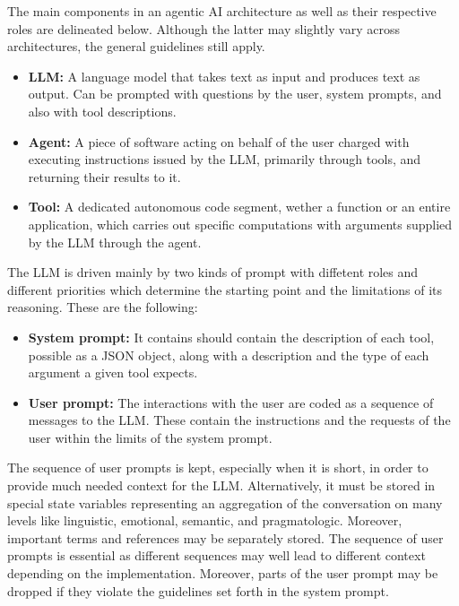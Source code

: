 \documentclass[conference, compsoc, final]{IEEEtran}
\begin{document}
The main components in an agentic AI architecture as well as their respective roles are delineated below. Although the latter may slightly vary across architectures, the general guidelines still apply.
\begin{itemize}

\item  \textbf{LLM:} A language model that takes text as input and produces text as output. Can be prompted with questions by the user, system prompts, and also with tool descriptions.

\item  \textbf{Agent:} A piece of software acting on behalf of the user charged with executing instructions issued by the LLM, primarily through tools, and returning their results to it.

\item  \textbf{Tool:} A dedicated autonomous code segment, wether a function or an entire application, which carries out specific computations with arguments supplied by the LLM through the agent.

\end{itemize}

The LLM is driven mainly by two kinds of prompt with diffetent roles and different priorities which determine the starting point and the limitations of its reasoning. These are the following:
\begin{itemize}

\item  \textbf{System prompt:} It contains should contain the description of each tool, possible as a JSON object, along with a description and the type of each argument a given tool expects.

\item  \textbf{User prompt:} The interactions with the user are coded as a sequence of messages to the LLM. These contain the instructions and the requests of the user within the limits of the system prompt.

\end{itemize}

The sequence of user prompts is kept, especially when it is short, in order to provide much needed context for the LLM. Alternatively, it must be stored in special state variables representing an aggregation of the conversation on many levels like linguistic, emotional, semantic, and pragmatologic. Moreover, important terms and references may be separately stored. The sequence of user prompts is essential as different sequences may well lead to different context depending on the implementation. Moreover, parts of the user prompt may be dropped if they violate the guidelines set forth in the system prompt.
\end{document}
